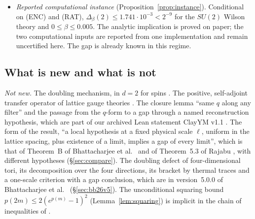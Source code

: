 \documentclass[11pt,a4paper]{article}
\theoremstyle{plain}
\theoremstyle{definition}
\theoremstyle{remark}
\numberwithin{equation}{section}
\newcommand{\st}[1]{\textsf{[#1]}}
\begin{document}
\begin{itemize}
and every coupling \st{proved} given that spectrum (numerically by $\ge1.7\cdot10^4$ \st{computed}). A massive free scalar passes numerically
for $M\ell\ge11.47$ ($d=4$) and $M\ell\ge8.47$ ($d=3$) \st{computed}; these crossings come from a truncated spectrum and carry no tail
certificate.
\item \emph{Reported computational instance} (Proposition~\ref{prop:instance}). Conditional on (ENC) and (RAT), $\Delta_\beta(2)\le1.741\cdot10^{-3}<2^{-9}$ for the $SU(2)$ Wilson theory and $0\le\beta\le0.005$. The analytic implication is proved on paper; the two computational inputs are reported from one implementation and remain uncertified here. The gap is already known in this regime.
\end{itemize}

\subsection{What is new and what is not}
\emph{Not new.} The doubling mechanism, in $d=2$ for spins \cite{OAI26}. The positive, self-adjoint transfer operator of lattice gauge
theories \cite{Lus77,OS78}. The closure lemma ``same $q$ along any filter'' and the passage from the $q$-form to a gap through a named
reconstruction hypothesis, which are part of our archived Lean statement ClayYM v1.1 \cite{ClayYM}. The form of the result, ``a local
hypothesis at a fixed physical scale $\ell$, uniform in the lattice spacing, plus existence of a limit, implies a gap of every limit'',
which is that of Theorem~B of Bhattacharjee et al.\ \cite{BB26} and of Theorem~5.3 of Rajabu \cite{Raj26}, with different hypotheses
(\S\ref{sec:compare}). The doubling defect of four-dimensional tori, its decomposition over the four directions, its bracket by thermal
traces and a one-scale criterion with a gap conclusion, which are in version~5.0.0 of Bhattacharjee et al.\ \cite{BB26v5}
(\S\ref{sec:bb26v5}). The unconditional squaring bound $p(2m)\le2(e^{p(m)}-1)^2$ (Lemma~\ref{lem:squaring}) is implicit in the chain of
inequalities of \cite[proof of Lemma~2.1]{OAI26}.
\end{document}
